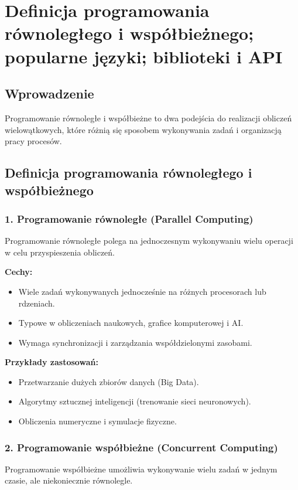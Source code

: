 \section{Definicja programowania równoległego i współbieżnego; popularne języki; biblioteki i API}

\subsection{Wprowadzenie}
Programowanie równoległe i współbieżne to dwa podejścia do realizacji obliczeń wielowątkowych, które różnią się sposobem wykonywania zadań i organizacją pracy procesów.

\subsection{Definicja programowania równoległego i współbieżnego}

\subsubsection{1. Programowanie równoległe (Parallel Computing)}
Programowanie równoległe polega na jednoczesnym wykonywaniu wielu operacji w celu przyspieszenia obliczeń.

\textbf{Cechy:}
\begin{itemize}
    \item Wiele zadań wykonywanych jednocześnie na różnych procesorach lub rdzeniach.
    \item Typowe w obliczeniach naukowych, grafice komputerowej i AI.
    \item Wymaga synchronizacji i zarządzania współdzielonymi zasobami.
\end{itemize}

\textbf{Przykłady zastosowań:}
\begin{itemize}
    \item Przetwarzanie dużych zbiorów danych (Big Data).
    \item Algorytmy sztucznej inteligencji (trenowanie sieci neuronowych).
    \item Obliczenia numeryczne i symulacje fizyczne.
\end{itemize}

\subsubsection{2. Programowanie współbieżne (Concurrent Computing)}
Programowanie współbieżne umożliwia wykonywanie wielu zadań w jednym czasie, ale niekoniecznie równolegle.

